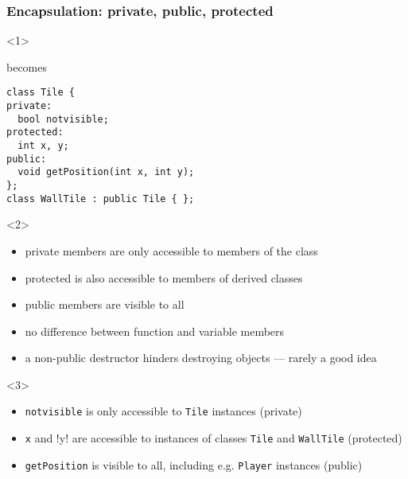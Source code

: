\documentclass{slides}
\begin{document}
\begin{frame}[fragile]
  \frametitle{Encapsulation: private, public, protected}

  \begin{onlyenv}<1>
    \begin{center}
    \end{center}
    \vspace{-\baselineskip}
    becomes
    \medskip
  \end{onlyenv}

\begin{lstlisting}[emph={public,private,protected}]
class Tile {
private:
  bool notvisible;
protected:
  int x, y;
public:
  void getPosition(int x, int y);
};
class WallTile : public Tile { };
\end{lstlisting}

  \begin{onlyenv}<2>
    \begin{itemize}
    \item \alert{private} members are only accessible to members of
      the class
    \item \alert{protected} is also accessible to members of derived
      classes
    \item \alert{public} members are visible to all
    \item no difference between function and variable members
    \item a non-public destructor hinders destroying objects ---
      rarely a good idea
    \end{itemize}
  \end{onlyenv}

  \begin{onlyenv}<3>
    \begin{itemize}
    \item \lstinline!notvisible! is only accessible to
      \lstinline!Tile!  instances (\alert{private})
    \item \lstinline!x! and !y! are accessible to instances of classes
      \lstinline!Tile! and \lstinline!WallTile! (\alert{protected})
    \item \lstinline!getPosition! is visible to all, including
      e.g. \lstinline!Player! instances (\alert{public})
    \end{itemize}
  \end{onlyenv}


\end{frame}
\end{document}
